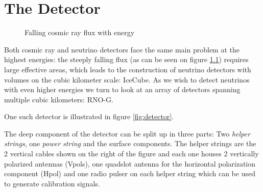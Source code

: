 \documentclass[11pt,a4paper,faculty=we,language=en,doctype=report]{cls/ugent-doc}
\begin{document}
\chapter{The Detector}
\begin{figure}
	\centering
	\caption{Falling cosmic ray flux with energy}
	\label{figure:FallingFlux}
\end{figure}
Both cosmic ray and neutrino detectors face the same main problem at the
highest energies: the steeply falling flux (as can be seen on figure \ref{figure:FallingFlux}) 
requires large effective areas, which
leads to the construction of neutrino detectors with volumes on the cubic
kilometer scale: IceCube. As we wish to detect neutrinos with even higher
energies we turn to look at an array of detectors spanning multiple cubic
kilometers: RNO-G.

One such detector is illustrated in figure \ref{fig:detector}.

The deep component of the detector can be split up in three parts: Two \textit{helper strings}, one \textit{power string} and the surface components. The helper strings are the 2 vertical cables shown on the right of the figure and each one houses 2 vertically polarized antennas (Vpols), one quadslot antenna for the horizontal polarization component (Hpol) and one radio pulser on each helper string which can be used to generate calibration signals.
\end{document}
